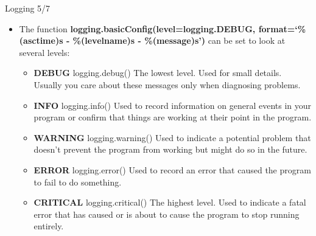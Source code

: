 \documentclass[
  8pt,
  ignorenonframetext,
]{beamer}
\providecommand{\tightlist}{%
  \setlength{\itemsep}{0pt}\setlength{\parskip}{0pt}}
\begin{document}
\begin{frame}{Logging 5/7}
\protect\hypertarget{logging-57}{}
\begin{itemize}
\tightlist
\item
  The function \textbf{logging.basicConfig(level=logging.DEBUG,
  format=`\%(asctime)s - \%(levelname)s - \%(message)s')} can be set to
  look at several levels:

  \begin{itemize}
  \tightlist
  \item
    \textbf{DEBUG} logging.debug() The lowest level. Used for small
    details. Usually you care about these messages only when diagnosing
    problems.
  \item
    \textbf{INFO} logging.info() Used to record information on general
    events in your program or confirm that things are working at their
    point in the program.
  \item
    \textbf{WARNING} logging.warning() Used to indicate a potential
    problem that doesn't prevent the program from working but might do
    so in the future.
  \item
    \textbf{ERROR} logging.error() Used to record an error that caused
    the program to fail to do something.
  \item
    \textbf{CRITICAL} logging.critical() The highest level. Used to
    indicate a fatal error that has caused or is about to cause the
    program to stop running entirely.
  \end{itemize}
\end{itemize}
\end{frame}
\end{document}

